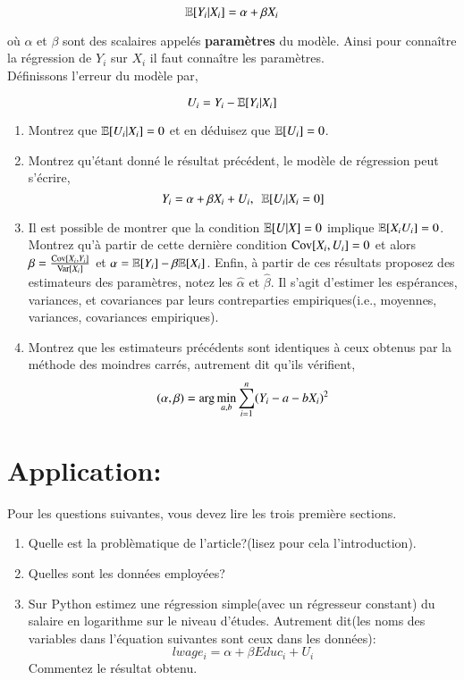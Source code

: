 \documentclass[10pt, reqno]{amsart}
\begin{document}
\[\mathbb{E}[Y_i|X_i] = \alpha + \beta X_i\]

où $\alpha$ et $\beta$ sont des scalaires appelés \textbf{paramètres} du modèle. Ainsi pour connaître la régression de $Y_i$ sur $X_i$ il faut connaître les paramètres.\\

Définissons l'erreur du modèle par,

\[U_i = Y_i - \mathbb{E}[Y_i|X_i]\]

\begin{enumerate}
\item Montrez que $\mathbb{E}[U_i|X_i] = 0$ et en déduisez que $\mathbb{E}[U_i] = 0$.
\item Montrez qu'étant donné le résultat précédent, le modèle de régression peut s'écrire,
\[Y_i = \alpha + \beta X_i + U_i, \ \ \mathbb{E}[U_i| X_i = 0]\]
\item Il est possible de montrer que la condition $\mathbb{E}[U|X] = 0$
  implique $\mathbb{E}[X_iU_i] = 0$. Montrez qu'à partir de cette dernière
  condition $\operatorname{Cov}[X_i, U_i] = 0$ et alors $\beta = \frac{\operatorname{Cov}[X_i,
    Y_i]}{\operatorname{Var}[X_i]}$ et $\alpha = \mathbb{E}[Y_i] - \beta\mathbb{E}[X_i]$. Enfin, à
  partir de ces résultats proposez des estimateurs des paramètres,
  notez les $\widehat{\alpha}$ et $\widehat{\beta}$. Il s'agit d'estimer les espérances, variances, et covariances par leurs contreparties empiriques(i.e., moyennes, variances, covariances empiriques).
\item Montrez que les estimateurs précédents sont identiques à ceux
  obtenus par la méthode des moindres carrés, autrement dit qu'ils
  vérifient,
\[(\alpha, \beta) = \arg\min_{a, b}\sum_{i=1}^n(Y_i - a -
  bX_i)^2\]


\end{enumerate}

\section{Application: \cite{card1993}}
Pour les questions suivantes, vous devez lire les trois première sections.
\begin{enumerate}
\item Quelle est la problèmatique de l'article?(lisez pour cela l'introduction).
\item Quelles sont les données employées?
\item Sur Python estimez une régression simple(avec un régresseur constant) du salaire en logarithme sur le niveau d'études. Autrement dit(les noms des variables dans l'équation suivantes sont ceux dans les données):
\[
lwage_i = \alpha + \beta Educ_i + U_i
\]
Commentez le résultat obtenu. 
\end{enumerate}
\end{document}
